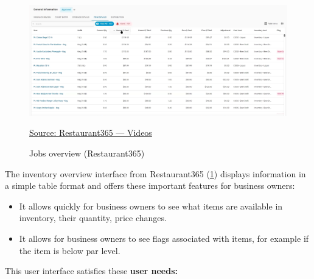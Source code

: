 \documentclass[]{VUMIFTemplateClass}
\begin{document}






\begin{figure}[H]
    \centering
    \includegraphics[width=\textwidth]{images/examples/inventory_r365.png}
    \caption{Jobs overview (Restaurant365)}
    \href{https://www.restaurant365.com/resource-category/videos/}{Source: Restaurant365 — Videos}
    \label{fig:inventory-overview}
\end{figure}

The inventory overview interface from Restaurant365 (\ref{fig:inventory-overview}) displays information in a simple table format and
offers these important features for business owners:

\begin{itemize}
    \item It allows quickly for business owners to see what items are available in inventory, their quantity, price changes.
    \item It allows for business owners to see flags associated with items, for example if the item is below par level.
\end{itemize}

This user interface satisfies these \textbf{user needs:}
\end{document}
